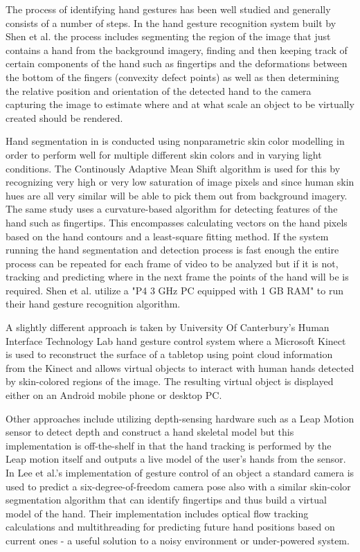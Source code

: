 The process of identifying hand gestures has been well studied and generally consists of a number of steps. In the hand gesture recognition system built by Shen et al. \cite{hand_ar_shen} the process includes segmenting the region of the image that just contains a hand from the background imagery, finding and then keeping track of certain components of the hand such as fingertips and the deformations between the bottom of the fingers (convexity defect points) as well as then determining the relative position and orientation of the detected hand to the camera capturing the image to estimate where and at what scale an object to be virtually created should be rendered. \newline

Hand segmentation in \cite{hand_ar_shen} is conducted using nonparametric skin color modelling in order to perform well for multiple different skin colors and in varying light conditions. The Continously Adaptive Mean Shift algorithm is used for this by recognizing very high or very low saturation of image pixels and since human skin hues are all very similar will be able to pick them out from background imagery. The same study uses a curvature-based algorithm for detecting features of the hand such as fingertips. This encompasses calculating vectors on the hand pixels based on the hand contours and a least-square fitting method. If the system running the hand segmentation and detection process is fast enough the entire process can be repeated for each frame of video to be analyzed but if it is not, tracking and predicting where in the next frame the points of the hand will be is required. Shen et al. utilize a "P4 3 GHz PC equipped with 1 GB RAM" to run their hand gesture recognition algorithm. 

A slightly different approach is taken by University Of Canterbury's Human Interface Technology Lab hand gesture control system \cite{canterbury_hand_ar} where a Microsoft Kinect is used to reconstruct the surface of a tabletop using point cloud information from the Kinect and allows virtual objects to interact with human hands detected by skin-colored regions of the image. The resulting virtual object is displayed either on an Android mobile phone or desktop PC. \newline

Other approaches include utilizing depth-sensing hardware such as a Leap Motion sensor to detect depth and construct a hand skeletal model \cite{kim_leap_ar} but this implementation is off-the-shelf in that the hand tracking is performed by the Leap motion itself and outputs a live model of the user's hands from the sensor. In Lee et al.'s implementation of gesture control of an object \cite{lee_hand_ar} a standard camera is used to predict a six-degree-of-freedom camera pose also with a similar skin-color segmentation algorithm that can identify fingertips and thus build a virtual model of the hand. Their implementation includes optical flow tracking calculations and multithreading for predicting future hand positions based on current ones - a useful solution to a noisy environment or under-powered system. \newline

